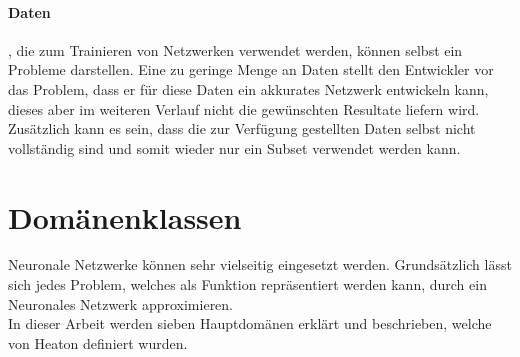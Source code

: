 \paragraph{Daten}, die zum Trainieren von Netzwerken verwendet werden, können selbst ein Probleme darstellen.
Eine zu geringe Menge an Daten stellt den Entwickler vor das Problem, dass er für diese Daten ein akkurates Netzwerk entwickeln kann, dieses aber im weiteren Verlauf nicht die gewünschten Resultate liefern wird.
Zusätzlich kann es sein, dass die zur Verfügung gestellten Daten selbst nicht vollständig sind und somit wieder nur ein Subset verwendet werden kann. \\


\section{Domänenklassen}
\label{sec:Domänenklassen}

Neuronale Netzwerke können sehr vielseitig eingesetzt werden. 
Grundsätzlich lässt sich jedes Problem, welches als Funktion repräsentiert werden kann, durch ein Neuronales Netzwerk approximieren. \\

\noindent
In dieser Arbeit werden sieben Hauptdomänen erklärt und beschrieben, welche von Heaton \cite{AI3} definiert wurden. %

